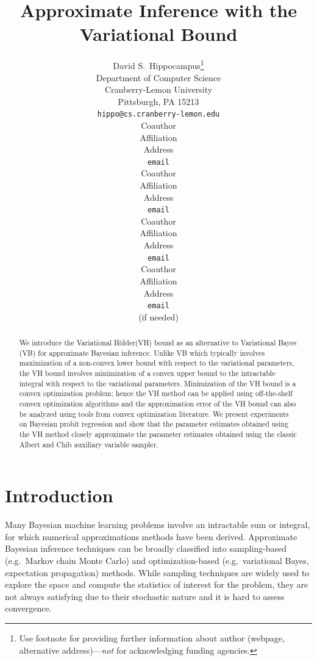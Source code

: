 \documentclass{article} %
\title{Approximate Inference with the Variational \Holder Bound}
\author{
David S.~Hippocampus\thanks{ Use footnote for providing further information
about author (webpage, alternative address)---\emph{not} for acknowledging
funding agencies.} \\
Department of Computer Science\\
Cranberry-Lemon University\\
Pittsburgh, PA 15213 \\
\texttt{hippo@cs.cranberry-lemon.edu} \\
\And
Coauthor \\
Affiliation \\
Address \\
\texttt{email} \\
\AND
Coauthor \\
Affiliation \\
Address \\
\texttt{email} \\
\And
Coauthor \\
Affiliation \\
Address \\
\texttt{email} \\
\And
Coauthor \\
Affiliation \\
Address \\
\texttt{email} \\
(if needed)\\
}
\newcommand{\Holder}{H\"older\xspace}
\begin{document}
\maketitle

\begin{abstract} 
We introduce the Variational \Holder (VH) bound as an alternative to Variational Bayes (VB) for approximate Bayesian inference. Unlike VB which typically involves maximization of a non-convex lower bound with respect to the variational parameters, the VH bound involves minimization of a convex upper bound to the intractable integral with respect to the variational parameters. Minimization of the VH bound is a convex optimization problem; hence the VH method can be applied using off-the-shelf convex optimization algorithms and the approximation error of the VH bound can also be analyzed using tools from convex optimization literature. We present experiments on Bayesian probit regression and show that the parameter estimates obtained using the VH method closely approximate the parameter estimates obtained using the classic Albert and Chib auxiliary variable sampler.
\end{abstract} 


\section{Introduction}
Many Bayesian machine learning problems involve an intractable sum or integral, for which
numerical approximations methods have been derived. Approximate Bayesian inference techniques can be broadly classified into sampling-based (e.g.~Markov chain Monte Carlo) and optimization-based (e.g.~variational Bayes, expectation propagation) methods.
While sampling techniques
are widely used to explore the space and compute the %
statistics  of
interest for the problem, they are not always satisfying due to their stochastic
nature and it is hard to assess convergence. %
\end{document}
